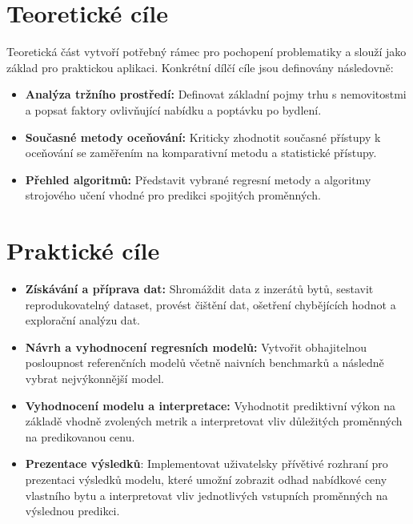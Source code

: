 \section{Teoretické cíle}

Teoretická část vytvoří potřebný rámec pro pochopení problematiky a slouží jako základ pro praktickou aplikaci. Konkrétní dílčí cíle jsou definovány následovně:

\begin{itemize}
    \item \textbf{Analýza tržního prostředí:} Definovat základní pojmy trhu s nemovitostmi a popsat faktory ovlivňující nabídku a poptávku po bydlení.
    \item \textbf{Současné metody oceňování:} Kriticky zhodnotit současné přístupy k oceňování se zaměřením na komparativní metodu a statistické přístupy.
    \item \textbf{Přehled algoritmů:} Představit vybrané regresní metody a algoritmy strojového učení vhodné pro predikci spojitých proměnných.
\end{itemize}


\section{Praktické cíle}

\begin{itemize}

 \item \textbf{Získávání a příprava dat:} Shromáždit data z inzerátů bytů, sestavit reprodukovatelný dataset, provést čištění dat, ošetření chybějících hodnot a explorační analýzu dat.

\item \textbf{Návrh a vyhodnocení regresních modelů:} Vytvořit obhajitelnou posloupnost referenčních modelů včetně naivních benchmarků a následně vybrat nejvýkonnější model.

 \item \textbf{Vyhodnocení modelu a interpretace:} Vyhodnotit prediktivní výkon na základě vhodně zvolených metrik a interpretovat vliv důležitých proměnných na predikovanou cenu.

 \item \textbf{Prezentace výsledků}: Implementovat uživatelsky přívětivé rozhraní pro prezentaci výsledků modelu, které umožní zobrazit odhad nabídkové ceny vlastního bytu a interpretovat vliv jednotlivých vstupních proměnných na výslednou predikci.
\end{itemize}

